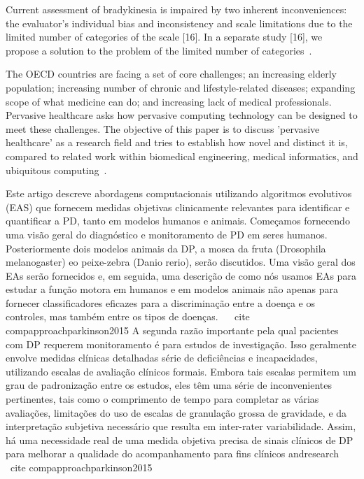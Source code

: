 Current assessment of bradykinesia is impaired by two inherent inconveniences: the evaluator’s individual bias and inconsistency and scale limitations due to the limited number of categories of the scale [16]. In a separate study [16], we propose a solution to the problem of the limited number of categories~\cite{bradmonitor2015}.


The OECD countries are facing a set of core challenges; an increasing elderly population; increasing number of chronic and lifestyle-related diseases; expanding scope of what medicine can do; and increasing lack of medical professionals. Pervasive healthcare asks how pervasive computing technology can be designed to meet these challenges. The objective of this paper is to discuss 'pervasive healthcare' as a research field and tries to establish how novel and distinct it is, compared to related work within biomedical engineering, medical informatics, and ubiquitous computing~\cite{bardram2008}.


Este artigo descreve abordagens computacionais utilizando algoritmos evolutivos (EAS) que fornecem medidas objetivas clinicamente relevantes para identificar e quantificar a PD, tanto em modelos humanos e animais. Começamos fornecendo uma visão geral do diagnóstico e monitoramento de PD em seres humanos. Posteriormente dois modelos animais da DP, a mosca da fruta (Drosophila melanogaster) eo peixe-zebra (Danio rerio), serão discutidos. Uma visão geral dos EAs serão fornecidos e, em seguida, uma descrição de como nós usamos EAs
para estudar a função motora em humanos e em modelos animais não apenas para fornecer classificadores eficazes para a discriminação entre a doença e os controles, mas também entre os tipos de doenças. ~ \ cite {compapproachparkinson2015}
A segunda razão importante pela qual pacientes com DP requerem monitoramento é para estudos de investigação. Isso geralmente envolve medidas clínicas detalhadas série de deficiências e incapacidades, utilizando escalas de avaliação clínicos formais. Embora tais escalas permitem um grau de padronização entre os estudos, eles têm uma série de inconvenientes pertinentes, tais como o comprimento de tempo para completar as várias avaliações, limitações do uso de escalas de granulação grossa de gravidade, e da interpretação subjetiva necessário que resulta em inter-rater variabilidade. Assim, há uma necessidade real de uma medida objetiva precisa de sinais clínicos de DP para melhorar a qualidade do acompanhamento para fins clínicos andresearch ~ \ cite {compapproachparkinson2015}

